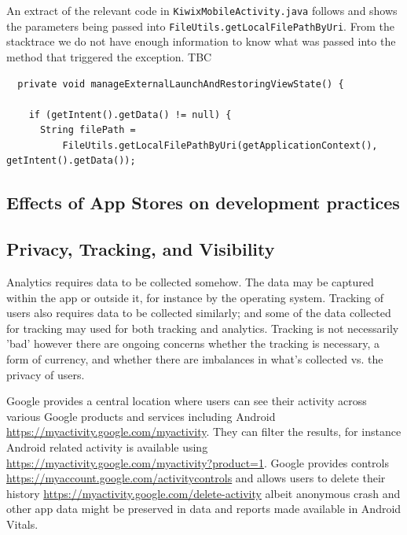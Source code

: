 An extract of the relevant code in \texttt{KiwixMobileActivity.java} follows and shows the parameters being passed into \texttt{FileUtils.getLocalFilePathByUri}. From the stacktrace we do not have enough information to know what was passed into the method that triggered the exception. TBC

\lstset{ 
  basicstyle=\footnotesize,
  firstnumber=1767
  }
  
\begin{lstlisting}
  private void manageExternalLaunchAndRestoringViewState() {

    if (getIntent().getData() != null) {
      String filePath =
          FileUtils.getLocalFilePathByUri(getApplicationContext(), getIntent().getData());
\end{lstlisting}
\subsection{Effects of App Stores on development practices}

\subsection{Privacy, Tracking, and Visibility}
Analytics requires data to be collected somehow. The data may be captured within the app or outside it, for instance by the operating system. Tracking of users also requires data to be collected similarly; and some of the data collected for tracking may used for both tracking and analytics. Tracking is not necessarily 'bad' however there are ongoing concerns whether the tracking is necessary, a form of currency, and whether there are imbalances in what's collected vs. the privacy of users. 

Google provides a central location where users can see their activity across various Google products and services including Android \url{https://myactivity.google.com/myactivity}. They can filter the results, for instance Android related activity is available using \url{https://myactivity.google.com/myactivity?product=1}. Google provides controls \url{https://myaccount.google.com/activitycontrols} and allows users to delete their history \url{https://myactivity.google.com/delete-activity} albeit anonymous crash and other app data might be preserved in data and reports made available in Android Vitals. 

